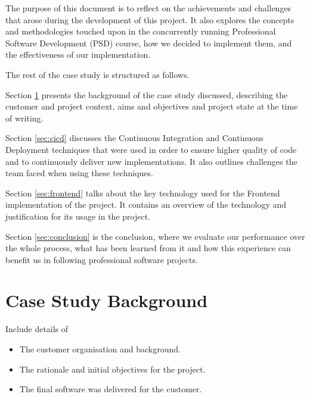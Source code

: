 \documentclass{l3proj}
\begin{document}
The purpose of this document is to reflect on the achievements and challenges that arose during the development of this project. It also explores the concepts and methodologies touched upon in the concurrently running Professional Software Development (PSD) course, how we decided to implement them, and the effectiveness of our implementation.

The rest of the case study is structured as follows. 

Section \ref{sec:background} presents the background of the case study discussed, describing the customer and project context, aims and objectives and project state at the time of writing.

Section \ref{sec:cicd} discusses the Continuous Integration and Continuous Deployment techniques that were used in order to ensure higher quality of code and to continuously deliver new implementations. It also outlines challenges the team faced when using these techniques.

Section \ref{sec:frontend} talks about the key technology used for the Frontend implementation of the project. It contains an overview of the technology and justification for its usage in the project.

Section \ref{sec:conclusion} is the conclusion, where we evaluate our performance over the whole process, what has been learned from it and how this experience can benefit us in following professional software projects.

\section{Case Study Background}
\label{sec:background}

Include details of

\begin{itemize}
\item The customer organisation and background.
\item The rationale and initial objectives for the project.
\item The final software was delivered for the customer.
\end{itemize}

%
\newpage
\end{document}
